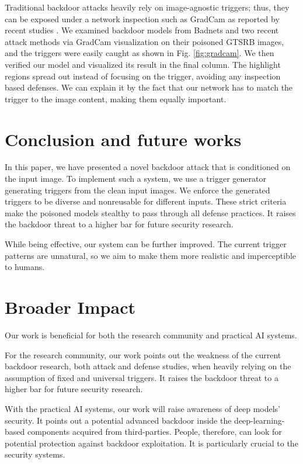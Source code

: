 \documentclass{article}
\begin{document}
Traditional backdoor attacks heavily rely on image-agnostic triggers; thus, they can be exposed under a network inspection such as GradCam \cite{selvaraju2017grad} as reported by recent studies \cite{Cheng2019,Doan2019Aug}. We examined backdoor models from Badnets and two recent attack methods \cite{ji2019programmable,salem2020dynamic} via GradCam visualization on their poisoned GTSRB images, and the triggers were easily caught as shown in Fig. \ref{fig:gradcam}. We then verified our model and visualized its result in the final column. The highlight regions spread out instead of focusing on the trigger, avoiding any inspection based defenses. We can explain it by the fact that our network has to match the trigger to the image content, making them equally important. 

\section{Conclusion and future works}
In this paper, we have presented a novel backdoor attack that is conditioned on the input image. To implement such a system, we use a trigger generator generating triggers from the clean input images. We enforce the generated triggers to be diverse and nonreusable for different inputs. These strict criteria make the poisoned models stealthy to pass through all defense practices. It raises the backdoor threat to a higher bar for future security research. 

While being effective, our system can be further improved. The current trigger patterns are unnatural, so we aim to make them more realistic and imperceptible to humans.

\section*{Broader Impact}
Our work is beneficial for both the research community and practical AI systems. 

For the research community, our work points out the weakness of the current backdoor research, both attack and defense studies, when heavily relying on the assumption of fixed and universal triggers. It raises the backdoor threat to a higher bar for future security research.

With the practical AI systems, our work will raise awareness of deep models' security. It points out a potential advanced backdoor inside the deep-learning-based components acquired from third-parties. People, therefore, can look for potential protection against backdoor exploitation. It is particularly crucial to the security systems.
\end{document}
